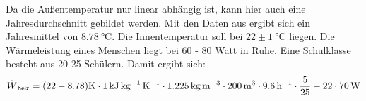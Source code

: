 \documentclass[12pt,a4paper,bibtotocnumbered,liststotocnumbered]{scrreprt}
\begin{document}
Da die Außentemperatur nur linear abhängig ist, kann hier auch eine Jahresdurchschnitt gebildet werden. Mit den Daten aus \cite{DWD_MD} ergibt sich ein Jahresmittel von $\SI{8.78}{\celsius}$. Die Innentemperatur soll bei $22\pm \SI{1}{\celsius}$ \cite[S. 109]{recknagel2009taschenbuch} liegen. Die Wärmeleistung eines Menschen liegt bei 60 - 80 Watt in Ruhe. Eine Schulklasse besteht aus 20-25 Schülern. Damit ergibt sich:
\begin{align}
\dot{W}_{\: \mathsf{heiz}} =(22 - 8.78)\SI{}{\kelvin} \cdot \SI{1}{\kilo\joule\per\kilo\gram\per\kelvin} \cdot \SI{1,225}{\kilo\gram\per\cubic\meter} \cdot \SI{200}{\cubic\meter} \cdot \SI{9.6}{\per\hour} \cdot \frac{5}{25} - 22 \cdot \SI{70}{\watt}
\end{align}




\newpage
\RaggedRight



\listoffigures

\listoftables
\end{document}
